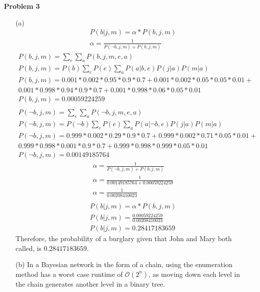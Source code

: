 \documentclass[11pt]{article}
\begin{document}
    \begin{center}
        \Large
        \textbf{Problem 3}
    \end{center}
    \normalsize
    \begin{enumerate}
        \item[(a)]
            \begin{gather*}
                P(b|j,m) = \alpha*P(b,j,m)\\
                \alpha = \frac{1}{P(\neg{b}, j, m) + P(b, j, m)}
            \end{gather*}
            \begin{gather*}
                P(b,j,m) = \sum_{e}\sum_{a}P(b,j,m,e,a)\\
                P(b,j,m) = P(b) \sum_{e} P(e) \sum_{a} P(a|b,e) P(j|a) P(m|a)\\
                P(b,j,m) =
                    0.001*0.002*0.95*0.9*0.7+
                    0.001*0.002*0.05*0.05*0.01+\\
                    0.001*0.998*0.94*0.9*0.7+
                    0.001*0.998*0.06*0.05*0.01\\
                P(b,j,m) = 0.00059224259\\
            \end{gather*}
            \begin{gather*}
                P(\neg{b},j,m) = \sum_{e}\sum_{a}P(\neg{b},j,m,e,a)\\
                P(\neg{b},j,m) = P(\neg{b}) \sum_{e} P(e) \sum_{a} P(a|\neg{b},e) P(j|a) P(m|a)\\
                P(\neg{b},j,m) =
                    0.999*0.002*0.29*0.9*0.7+
                    0.999*0.002*0.71*0.05*0.01+\\
                    0.999*0.998*0.001*0.9*0.7+
                    0.999*0.998*0.999*0.05*0.01\\
                P(\neg{b},j,m) = 0.00149185764
            \end{gather*}
            \begin{gather*}
                \alpha = \frac{1}{P(\neg{b}, j, m) + P(b, j, m)}\\
                \alpha = \frac{1}{0.00149185764 + 0.00059224259}\\
                \alpha = \frac{1}{0.00208410023}\\
            \end{gather*}
            \begin{gather*}
                P(b|j,m) = \alpha*P(b,j,m)\\
                P(b|j,m) = \frac{0.00059224259}{0.00208410023}\\
                P(b|j,m) = 0.28417183659
            \end{gather*}
        Therefore, the probability of a burglary given that John and Mary both called, is
        $0.28417183659$.
        \item[(b)] In a Bayesian network in the form of a chain, using the enumeration
        method has a worst case runtime of $\mathcal{O}(2^n)$, as moving down each level
        in the chain generates another level in a binary tree.\\


\end{enumerate}
\end{document}
